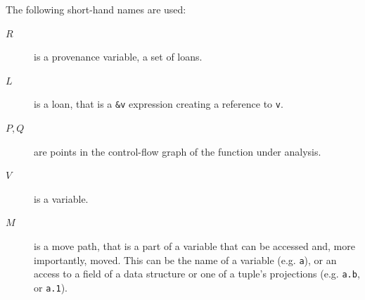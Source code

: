 \documentclass[11pt,a4paper,twoside,openany]{report}
\newcommand{\InRust}[1]{\texttt{#1}}
\begin{document}
The following short-hand names are used:
\begin{description}
\item[$R$] is a provenance variable, a set of loans.
\item[$L$] is a loan, that is a \InRust{&v} expression creating a reference
  to \InRust{v}.
\item[$P, Q$] are points in the control-flow graph of the function under analysis.
\item[$V$] is a variable.
\item[$M$] is a move path, that is a part of a variable that can be accessed
  and, more importantly, moved. This can be the name of a variable (e.g.
  \InRust{a}), or an access to a field of a data structure or one of a tuple's
  projections (e.g. \InRust{a.b}, or \InRust{a.1}).
\end{description}
\end{document}
